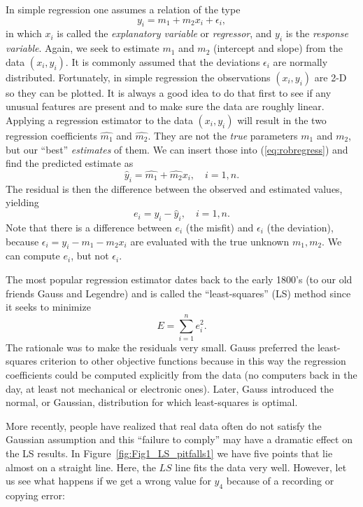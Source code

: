 	In simple regression one assumes a relation of the type
\begin{equation}
y_i = m_1 + m_2 x_i + \epsilon_i,
\label{eq:robregress}
\end{equation}
in which $x_i$ is called the \emph{explanatory variable} or \emph{regressor}, and $y_i$ is the \emph{response variable}.
Again, we seek to estimate $m_1$ and $m_2$ (intercept and slope) from the data 
$(x_i , y_i)$.  It is commonly assumed 
that the deviations $\epsilon_i$ are normally distributed.
Fortunately, in simple regression the observations $(x_i, y_i)$ are 2-D so they can be plotted.  It 
is always a good idea to do that first to see if any unusual features are present and to make sure 
the data are roughly linear.
Applying a regression estimator to the data $(x_i, y_i)$ will result in the two regression 
coefficients $\hat{m_1}$  and $\hat{m_2}$.  They are not the \emph{true} parameters $m_1$ and $m_2$, but our ``best'' \emph{estimates} of 
them.  We can insert those into (\ref{eq:robregress}) and find the predicted estimate as
\begin{equation}
\hat{y}_i = \hat{m_1} + \hat{m_2} x_i,\quad i = 1,n.
\end{equation}	 
The residual is then the difference between the observed and estimated values, yielding
\begin{equation}
e_i = y_i - \hat{y}_i,\quad i = 1,n.
\end{equation} 	
Note that there is a difference between $e_i$ (the misfit) and 
$\epsilon_i$ (the deviation), because $\epsilon_i = y_i - m_1 - m_2 x_i$ are
evaluated with the true unknown $m_1,m_2$.  We can compute $e_i$, but not $\epsilon_i$.

	The most popular regression estimator dates back to the early 1800's (to our old friends Gauss and Legendre) 
and is called the ``least-squares'' (LS) method since it seeks to minimize
\begin{equation}
E = \sum^n_{i=1} e^2_i.
\end{equation}	 
The rationale was to make the residuals very small.  Gauss preferred the least-squares 
criterion to other objective functions because in this way the regression coefficients could be 
computed explicitly from the data (no computers back in the day, at least not mechanical or electronic ones).
Later, Gauss introduced the  normal, or Gaussian, distribution for which least-squares is optimal.
	
More recently, people have realized that real data often do not satisfy the Gaussian 
assumption and this ``failure to comply'' may have a dramatic effect on the LS results.  In Figure~\ref{fig:Fig1_LS_pitfalls1} we have five points that lie almost 
on a straight line.  Here, the $LS$ line fits the data very well.  However, let us see what happens if 
we get a wrong value for $y_4$ because of a recording or copying error:
	 
